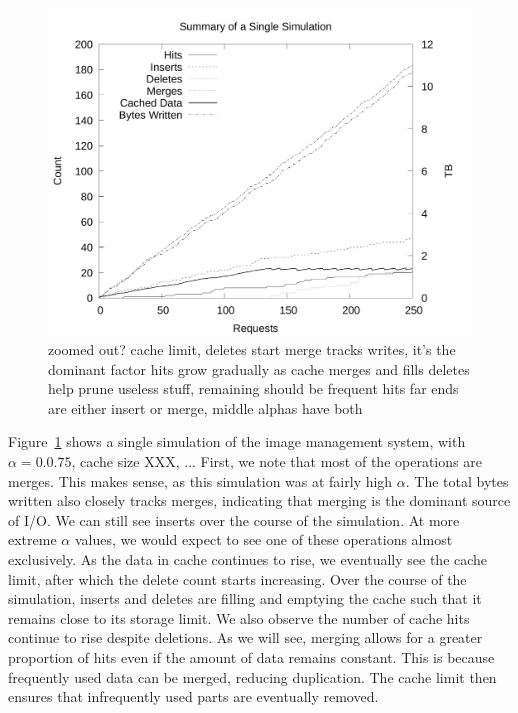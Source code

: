 \documentclass[sigconf]{acmart}
\begin{document}
\begin{figure}
\includegraphics[width=\linewidth]{curated/time-series/time-series.pdf}
\label{fig:series}
zoomed out?
cache limit, deletes start
merge tracks writes, it's the dominant factor
hits grow gradually as cache merges and fills
deletes help prune useless stuff, remaining should be frequent hits
far ends are either insert or merge, middle alphas have both
\fi
\end{figure}

Figure~\ref{fig:series} shows a single simulation of the image management system,
with $\alpha=0.0.75$, cache size XXX, ...
First, we note that most of the operations are merges.
This makes sense, as this simulation was at fairly high $\alpha$.
The total bytes written also closely tracks merges,
indicating that merging is the dominant source of I/O.
We can still see inserts over the course of the simulation.
At more extreme $\alpha$ values,
we would expect to see one of these operations almost exclusively.
As the data in cache continues to rise,
we eventually see the cache limit,
after which the delete count starts increasing.
Over the course of the simulation,
inserts and deletes are filling and emptying the cache such that it remains close to its storage limit.
We also observe the number of cache hits continue to rise despite deletions.
As we will see, merging allows for a greater proportion of hits even if the amount of data remains constant.
This is because frequently used data can be merged,
reducing duplication.
The cache limit then ensures that infrequently used parts are eventually removed.
\end{document}
